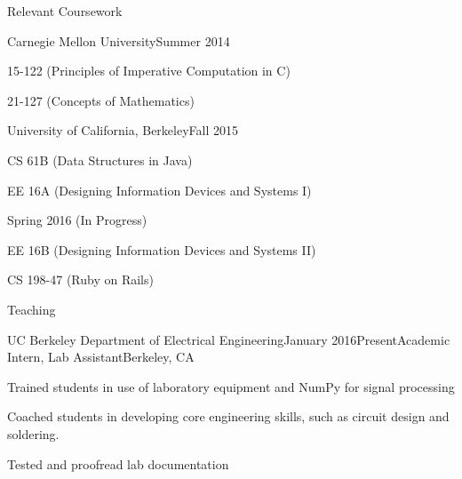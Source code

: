\documentclass{resume} %
\begin{document}
\pagebreak

\begin{rSection}{Relevant Coursework}

\begin{rSubsection}{Carnegie Mellon University}{}{Summer 2014}{}
\item 15-122 (Principles of Imperative Computation in C)
\item 21-127 (Concepts of Mathematics)
\end{rSubsection}

\begin{rSubsection}{University of California, Berkeley}{}{Fall 2015}{}
\item CS 61B (Data Structures in Java)
\item EE 16A (Designing Information Devices and Systems I)
\end{rSubsection}
\begin{rSubsection}{}{}{Spring 2016 (In Progress)}{}
\item EE 16B (Designing Information Devices and Systems II)
\item CS 198-47 (Ruby on Rails)
\end{rSubsection}

\end{rSection}

\begin{rSection}{Teaching}
\begin{rSubsection}{UC Berkeley Department of Electrical Engineering}{January 2016\textminus Present}{Academic Intern, Lab Assistant}{Berkeley, CA}
\item Trained students in use of laboratory equipment and NumPy for signal processing
\item Coached students in developing core engineering skills, such as circuit design and soldering.
\item Tested and proofread lab documentation
\end{rSubsection}
\end{rSection}






\end{document}
